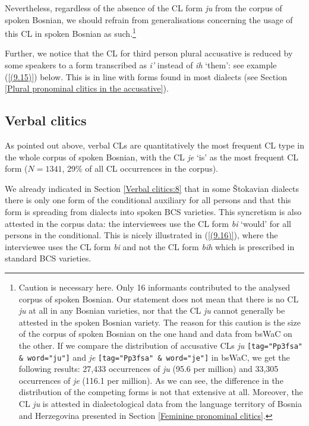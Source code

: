 \noindent Nevertheless, regardless of the absence of the CL form \textit{ju} from the corpus of spoken Bosnian, we should refrain from generalisations concerning the usage of this CL in spoken Bosnian as such.\footnote{Caution is necessary here. Only 16 informants contributed to the analysed corpus of spoken Bosnian. Our statement does not mean that there is no CL \textit{ju} at all in any Bosnian varieties, nor that the CL \textit{ju} cannot generally be attested in the spoken Bosnian variety. The reason for this caution is the size of the corpus of spoken Bosnian on the one hand and data from bsWaC on the other. If we compare the distribution of accusative CLs \textit{ju} \texttt{[tag="Pp3fsa" \& word="ju"]} and \textit{je} \texttt{[tag="Pp3fsa" \& word="je"]} in bsWaC, we get the following results: 27,433 occurrences of \textit{ju} (95.6 per million) and 33,305 occurrences of \textit{je} (116.1 per million). As we can see, the difference in the distribution of the competing forms is not that extensive at all. Moreover, the CL \textit{ju} is attested in dialectological data from the language territory of Bosnia and Herzegovina presented in Section \ref{Feminine pronominal clitics}.}

Further, we notice that the CL for third person plural accusative is reduced by some speakers to a form transcribed as \textit{i’} instead of \textit{ih} ‘them’: see example (\ref{(9.15)}) below. This is in line with forms found in most dialects (see Section \ref{Plural pronominal clitics in the accusative}).


\subsection{Verbal clitics}
\label{Verbal clitics:9}
As pointed out above, verbal CLs are quantitatively the most frequent CL type in the whole corpus of spoken Bosnian, with the CL \textit{je} ‘is’ as the most frequent CL form ($N=1341$, 29\% of all CL occurrences in the corpus).

We already indicated in Section \ref{Verbal clitics:8} that in some Štokavian dialects there is only one form of the conditional auxiliary for all persons and that this form is spreading from dialects into spoken BCS varieties. This syncretism is also attested in the corpus data: the interviewees use the CL form \textit{bi} ‘would’ for all persons in the conditional. This is nicely illustrated in (\ref{(9.16)}), where the interviewee uses the CL form \textit{bi} and not the CL form \textit{bih} which is prescribed in standard BCS varieties. 

